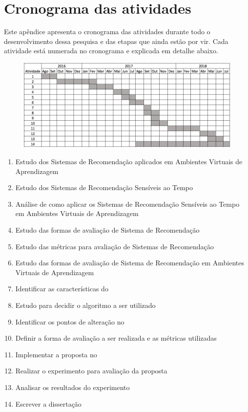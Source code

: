 \chapter{Cronograma das atividades}\label{ape:cronograma}

Este apêndice apresenta o cronograma das atividades durante todo o desenvolvimento dessa pesquisa e das etapas que ainda
estão por vir. Cada atividade está numerada no cronograma e explicada em detalhe abaixo.

\begin{figure}[htb]
  \begin{center}
      \includegraphics[scale=0.45]{./Figuras/cronograma.png}
  \end{center}
\end{figure}

\begin{enumerate}
\item Estudo dos Sistemas de Recomendação aplicados em Ambientes Virtuais de Aprendizagem
\item Estudo dos Sistemas de Recomendação Sensíveis ao Tempo
\item Análise de como aplicar os Sistemas de Recomendação Sensíveis ao Tempo em Ambientes Virtuais de Aprendizagem
\item Estudo das formas de avaliação de Sistema de Recomendação
\item Estudo das métricas para avaliação de Sistemas de Recomendação
\item Estudo das formas de avaliação de Sistema de Recomendação em Ambientes Virtuais de Aprendizagem
\item Identificar as características do \adaptweb
\item Estudo para decidir o algoritmo a ser utilizado
\item Identificar os pontos de alteração no \adaptweb
\item Definir a forma de avaliação a ser realizada e as métricas utilizadas
\item Implementar a proposta no \adaptweb
\item Realizar o experimento para avaliação da proposta
\item Analisar os resultados do experimento
\item Escrever a dissertação
\end{enumerate}
